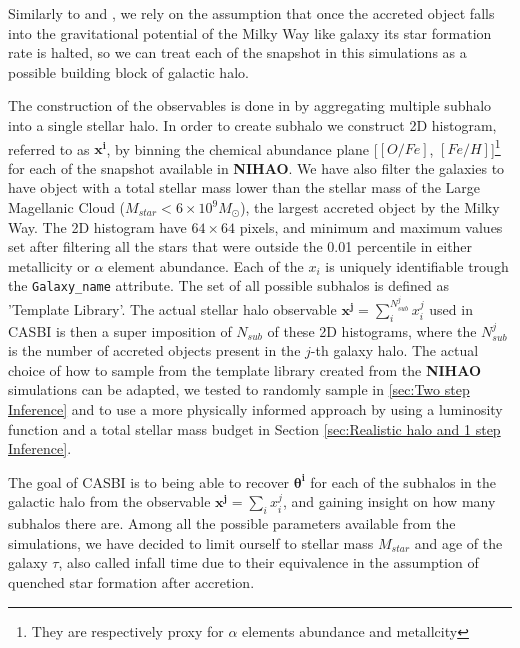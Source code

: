 Similarly to \cite{cunninghamReadingCARDsImprint2022} and \cite{deasonUnravellingMassSpectrum2023}, we rely on the assumption that once the accreted object falls into the gravitational potential of the Milky Way like galaxy its star formation rate is halted, so we can treat each of the snapshot in this simulations as a possible building block of galactic halo. 

The construction of the observables is done in by aggregating multiple subhalo into a single stellar halo. In order to create subhalo we construct 2D histogram, referred to as \textbf{$\mathbf{x^i}$}, by binning the chemical abundance plane [$[O/Fe]$, $[Fe/H]$]\footnote{They are respectively proxy for $\alpha$ elements abundance and metallcity} for each of the snapshot available in \textbf{NIHAO}. We have also filter the galaxies to have object with a total stellar mass lower than the stellar mass of the Large Magellanic Cloud ($M_{star} < 6 \times 10^9 M_\odot$), the largest accreted object by the Milky Way. The 2D histogram have $64 \times 64$ pixels, and minimum and maximum values set after filtering all the stars that were outside the 0.01 percentile in either metallicity or $\alpha$ element abundance. Each of the $x_i$ is uniquely identifiable trough the \texttt{Galaxy\_name} attribute. The set of all possible subhalos is defined as 'Template Library'. The actual stellar halo observable \textbf{$\mathbf{x^j} = \sum_i^{N_{sub}^j} x^j_i$ } used in CASBI is then a super imposition of $N_{sub}$ of these 2D histograms, where the $N_{sub}^j$ is the number of accreted objects present in the $j$-th galaxy halo. The actual choice of how to sample from the template library created from the \textbf{NIHAO} simulations can be adapted, we tested to randomly sample in \ref{sec:Two step Inference} and to use a more physically informed approach by using a luminosity function and a total stellar mass budget in Section \ref{sec:Realistic halo and 1 step Inference}. 

  
The goal of CASBI is to being able to recover $\mathbf{\theta^i}$ for each of the subhalos in the galactic halo from the observable \textbf{$\mathbf{x^j}$}$=\sum_i x^j_i$, and gaining insight on how many subhalos there are. Among all the possible parameters available from the simulations, we have decided to limit ourself to stellar mass $M_{star}$ and age of the galaxy $\tau$, also called infall time due to their equivalence in the assumption of quenched star formation after accretion.  


